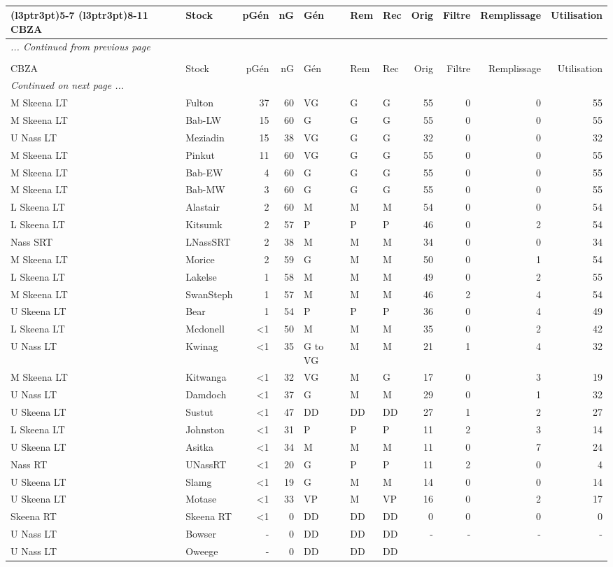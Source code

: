 \documentclass[french,11pt]{book}
\begin{document}
\begin{longtable}[t]{llrrlllrrrr}
\cmidrule(l{3pt}r{3pt}){5-7} \cmidrule(l{3pt}r{3pt}){8-11} CBZA & Stock & pGén & nG & Gén & Rem & Rec & Orig & Filtre & Remplissage & Utilisation\\ \midrule \endfirsthead \multicolumn{11}{l}{\textit{... Continued from previous page}} \\ \hline \caption*{}\\ \toprule CBZA & Stock & pGén & nG & Gén & Rem & Rec & Orig & Filtre & Remplissage & Utilisation\\ \midrule \endhead \hline \multicolumn{11}{l}{\textit{Continued on next page ...}} \\ \endfoot \bottomrule \endlastfoot M Skeena LT & Fulton & 37 & 60 & VG & G & G & 55 & 0 & 0 & 55\\ M Skeena LT & Bab-LW & 15 & 60 & G & G & G & 55 & 0 & 0 & 55\\ U Nass LT & Meziadin & 15 & 38 & VG & G & G & 32 & 0 & 0 & 32\\ M Skeena LT & Pinkut & 11 & 60 & VG & G & G & 55 & 0 & 0 & 55\\ M Skeena LT & Bab-EW & 4 & 60 & G & G & G & 55 & 0 & 0 & 55\\ M Skeena LT & Bab-MW & 3 & 60 & G & G & G & 55 & 0 & 0 & 55\\ L Skeena LT & Alastair & 2 & 60 & M & M & M & 54 & 0 & 0 & 54\\ L Skeena LT & Kitsumk & 2 & 57 & P & P & P & 46 & 0 & 2 & 54\\ Nass SRT & LNassSRT & 2 & 38 & M & M & M & 34 & 0 & 0 & 34\\ M Skeena LT & Morice & 2 & 59 & G & M & M & 50 & 0 & 1 & 54\\ L Skeena LT & Lakelse & 1 & 58 & M & M & M & 49 & 0 & 2 & 55\\ M Skeena LT & SwanSteph & 1 & 57 & M & M & M & 46 & 2 & 4 & 54\\ U Skeena LT & Bear & 1 & 54 & P & P & P & 36 & 0 & 4 & 49\\ L Skeena LT & Mcdonell & <1 & 50 & M & M & M & 35 & 0 & 2 & 42\\ U Nass LT & Kwinag & <1 & 35 & G to VG & M & M & 21 & 1 & 4 & 32\\ M Skeena LT & Kitwanga & <1 & 32 & VG & M & G & 17 & 0 & 3 & 19\\ U Nass LT & Damdoch & <1 & 37 & G & M & M & 29 & 0 & 1 & 32\\ U Skeena LT & Sustut & <1 & 47 & DD & DD & DD & 27 & 1 & 2 & 27\\ L Skeena LT & Johnston & <1 & 31 & P & P & P & 11 & 2 & 3 & 14\\ U Skeena LT & Asitka & <1 & 34 & M & M & M & 11 & 0 & 7 & 24\\ Nass RT & UNassRT & <1 & 20 & G & P & P & 11 & 2 & 0 & 4\\ U Skeena LT & Slamg & <1 & 19 & G & M & M & 14 & 0 & 0 & 14\\ U Skeena LT & Motase & <1 & 33 & VP & M & VP & 16 & 0 & 2 & 17\\ Skeena RT & Skeena RT & <1 & 0 & DD & DD & DD & 0 & 0 & 0 & 0\\ U Nass LT & Bowser & - & 0 & DD & DD & DD & - & - & - & -\\ U Nass LT & Oweege & - & 0 & DD & DD & DD 
\end{longtable}
\end{document}
